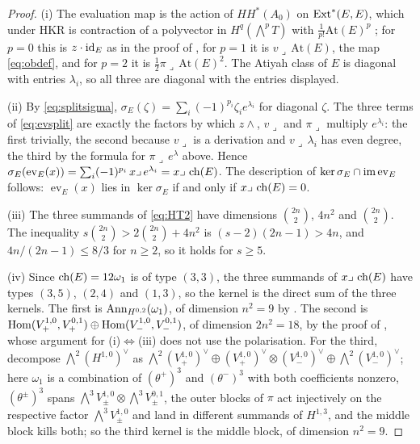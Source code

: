 \begin{proof}
(i) The evaluation map is the action of $HH^{*}(A_{0})$ on
$\operatorname{Ext}^{*}(E,E)$, which under HKR is contraction of a polyvector in
$H^{q}(\bigwedge^{p}T)$ with $\tfrac{1}{p!}\mathrm{At}(E)^{p}$
\cite{BF08}; for $p=0$ this is $z\cdot\operatorname{id}_{E}$ as in the proof of
, for $p=1$ it is $v\lrcorner\,\mathrm{At}(E)$, the map
\eqref{eq:obdef}, and for $p=2$ it is $\tfrac12\pi\lrcorner\,\mathrm{At}(E)^{2}$.
The Atiyah class of $E$ is diagonal with entries $\lambda_{i}$, so all three
are diagonal with the entries displayed.

(ii) By \eqref{eq:splitsigma}, $\sigma_{E}(\zeta)=\sum_{i}(-1)^{p_{i}}\zeta_{i}
e^{\lambda_{i}}$ for diagonal $\zeta$. The three terms of \eqref{eq:evsplit}
are exactly the factors by which $z\wedge$, $v\lrcorner$ and $\pi\lrcorner$
multiply $e^{\lambda_{i}}$: the first trivially, the second because
$v\lrcorner$ is a derivation and $v\lrcorner\,\lambda_{i}$ has even degree,
the third by the formula for $\pi\lrcorner\,e^{\lambda}$ above. Hence
$\sigma_{E}(\operatorname{ev}_{E}(x))=\sum_{i}(-1)^{p_{i}}\,x\lrcorner\,
e^{\lambda_{i}}=x\lrcorner\,\operatorname{ch}(E)$. The description of
$\ker\sigma_{E}\cap\operatorname{im}\operatorname{ev}_{E}$ follows: $\operatorname{ev}_{E}(x)$
lies in $\ker\sigma_{E}$ if and only if $x\lrcorner\,\operatorname{ch}(E)=0$.

(iii) The three summands of \eqref{eq:HT2} have dimensions $\binom{2n}{2}$,
$4n^{2}$ and $\binom{2n}{2}$. The inequality
$s\binom{2n}{2}>2\binom{2n}{2}+4n^{2}$ is $(s-2)(2n-1)>4n$, and
$4n/(2n-1)\le8/3$ for $n\ge2$, so it holds for $s\ge5$.

(iv) Since $\operatorname{ch}(E)=12\omega_{1}$ is of type $(3,3)$, the three summands of
$x\lrcorner\,\operatorname{ch}(E)$ have types $(3,5)$, $(2,4)$ and $(1,3)$, so the kernel
is the direct sum of the three kernels. The first is $\operatorname{Ann}_{H^{0,2}}(\omega_{1})$,
of dimension $n^{2}=9$ by . The second is
$\operatorname{Hom}(V_{+}^{1,0},V_{+}^{0,1})\oplus\operatorname{Hom}(V_{-}^{1,0},V_{-}^{0,1})$, of
dimension $2n^{2}=18$, by the proof of , whose
argument for (i)$\Leftrightarrow$(iii) does not use the polarisation. For the
third, decompose $\bigwedge^{2}(H^{1,0})^{\vee}$ as
$\bigwedge^{2}(V_{+}^{1,0})^{\vee}\oplus(V_{+}^{1,0})^{\vee}\otimes(V_{-}^{1,0})^{\vee}
\oplus\bigwedge^{2}(V_{-}^{1,0})^{\vee}$; here $\omega_{1}$ is a combination
of $(\theta^{+})^{3}$ and $(\theta^{-})^{3}$ with both coefficients nonzero,
$(\theta^{\pm})^{3}$ spans $\bigwedge^{3}V_{\pm}^{1,0}\otimes\bigwedge^{3}V_{\pm}^{0,1}$,
the outer blocks of $\pi$ act injectively on the respective factor
$\bigwedge^{3}V_{\pm}^{1,0}$ and land in different summands of $H^{1,3}$,
and the middle block kills both; so the third kernel is the middle block,
of dimension $n^{2}=9$.


\end{proof}
